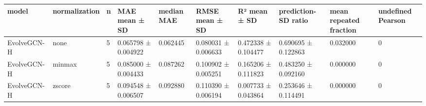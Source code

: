 \begin{tabular}{llllllllll}
\hline
model & normalization & n & MAE mean ± SD & median MAE & RMSE mean ± SD & R² mean ± SD & prediction-SD ratio & mean repeated fraction & undefined Pearson \\
\hline
EvolveGCN-H & none & 5 & 0.065798 ± 0.004922 & 0.062445 & 0.080031 ± 0.006633 & 0.472338 ± 0.104477 & 0.690695 ± 0.122863 & 0.032000 & 0 \\
EvolveGCN-H & minmax & 5 & 0.085000 ± 0.004433 & 0.087262 & 0.100902 ± 0.005251 & 0.165206 ± 0.111823 & 0.483250 ± 0.092160 & 0.000000 & 0 \\
EvolveGCN-H & zscore & 5 & 0.094548 ± 0.006507 & 0.092880 & 0.110390 ± 0.006194 & 0.007733 ± 0.043864 & 0.253646 ± 0.114491 & 0.000000 & 0 \\
\hline
\end{tabular}
